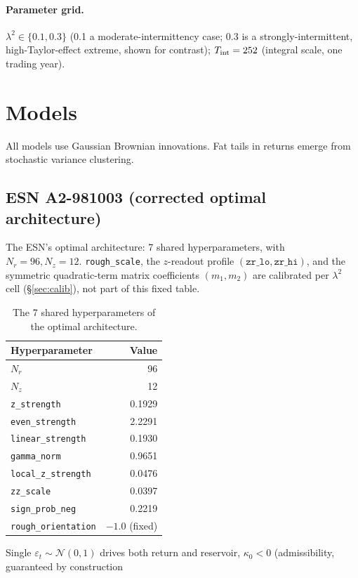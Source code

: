 \documentclass[11pt,a4paper]{article}
\begin{document}
\paragraph{Parameter grid.}
$\lambda^2\in\{0.1,0.3\}$ (0.1 a moderate-intermittency case; 0.3 is a
strongly-intermittent, high-Taylor-effect extreme, shown for contrast);
$T_{\rm int}=252$ (integral scale, one trading year).

\section{Models}

All models use Gaussian Brownian innovations.
Fat tails in returns emerge from stochastic variance clustering.

\subsection{ESN A2-981003 (corrected optimal architecture)}
The ESN's optimal architecture: 7 shared hyperparameters, with
$N_r=96,N_z=12$. \texttt{rough\_scale}, the $z$-readout profile
$(\texttt{zr\_lo},\texttt{zr\_hi})$, and the symmetric quadratic-term
matrix coefficients $(m_1,m_2)$ are calibrated per $\lambda^2$ cell
(\S\ref{sec:calib}), not part of this fixed table.
\begin{table}[H]
\centering
\caption{The 7 shared hyperparameters of the optimal architecture.}
\label{tab:optarch}
\begin{tabular}{@{}lr@{}}
\toprule
Hyperparameter & Value \\
\midrule
$N_r$ & 96 \\
$N_z$ & 12 \\
\texttt{z\_strength} & 0.1929 \\
\texttt{even\_strength} & 2.2291 \\
\texttt{linear\_strength} & 0.1930 \\
\texttt{gamma\_norm} & 0.9651 \\
\texttt{local\_z\_strength} & 0.0476 \\
\texttt{zz\_scale} & 0.0397 \\
\texttt{sign\_prob\_neg} & 0.2219 \\
\texttt{rough\_orientation} & $-1.0$ (fixed) \\
\bottomrule
\end{tabular}
\end{table}
Single $\varepsilon_t\sim\mathcal{N}(0,1)$ drives both return and
reservoir, $\kappa_0<0$ (admissibility, guaranteed by construction
\end{document}
